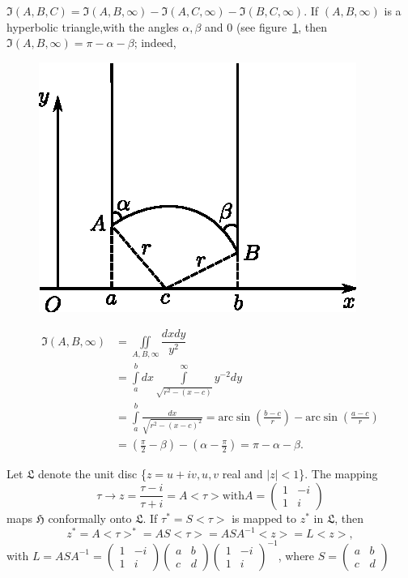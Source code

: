 $\mathfrak{I} (A,B,C)=\mathfrak{I}(A,B,\infty) - \mathfrak{I}(A,C,\infty)
- \mathfrak{I}(B,C,\infty)$. If $(A,B,\infty)$ is a hyperbolic
triangle,\pageoriginale with the angles $\alpha, \beta$ and $0$ (see
figure~\ref{chap1:fig3}, then 
$\mathfrak{I}(A,B,\infty)=\pi-\alpha-\beta$; indeed,

\begin{figure}[H]
\centering
\includegraphics{vol29-fig/fig29-3.eps}
\smallskip
\caption{}
\label{chap1:fig3}
\end{figure}

\begin{align*}
\mathfrak{I}(A,B,\infty) &
=\iint\limits_{A,B,\infty}\dfrac{dxdy}{y^2} \\
& = \int\limits^b_a dx \int\limits^{\infty}_{\sqrt{r^2-(x-c)}} y^{-2}
dy\\
& = \int\limits^b_a \frac{dx}{\sqrt{r^2-(x-c)^2}} = \text{arc} \sin
\left(\frac{b-c}{r}\right)-\text{arc} \sin \left(\frac{a-c}{r}\right)\\
& = \left(\frac{\pi}{2}-\beta\right) - \left(\alpha -
\frac{\pi}{2}\right) = \pi - \alpha - \beta. 
\end{align*}

Let $\mathfrak{L}$ denote the unit disc \{$z=u+iv,u,v$ real and
$|z|<1$\}. The mapping 
$$
\tau \to z = \frac{\tau-i}{\tau + i} = A <\tau> \text{with} A =
\left(\begin{smallmatrix}
1&-i\\1&i\end{smallmatrix}\right)
$$
maps $\mathfrak{H}$ conformally onto $\mathfrak{L}$. If $\tau^{\ast} =
S<\tau>$ is mapped to $z^{\ast}$ in $\mathfrak{L}$, then 
$$
z^{\ast} = A <\tau>^{\ast} = A S <\tau> = A S A^{-1} <z> = L <z>,
$$
with $L = ASA^{-1} =\left(\begin{smallmatrix}
1&-i\\1&i\end{smallmatrix}\right)\left(\begin{smallmatrix}
a&b\\c & d\end{smallmatrix}\right)\left(\begin{smallmatrix}
1&-i\\1&i\end{smallmatrix}\right)^{-1}$, where $S=\left(\begin{smallmatrix}
a & b \\ c & d\end{smallmatrix}\right)$

